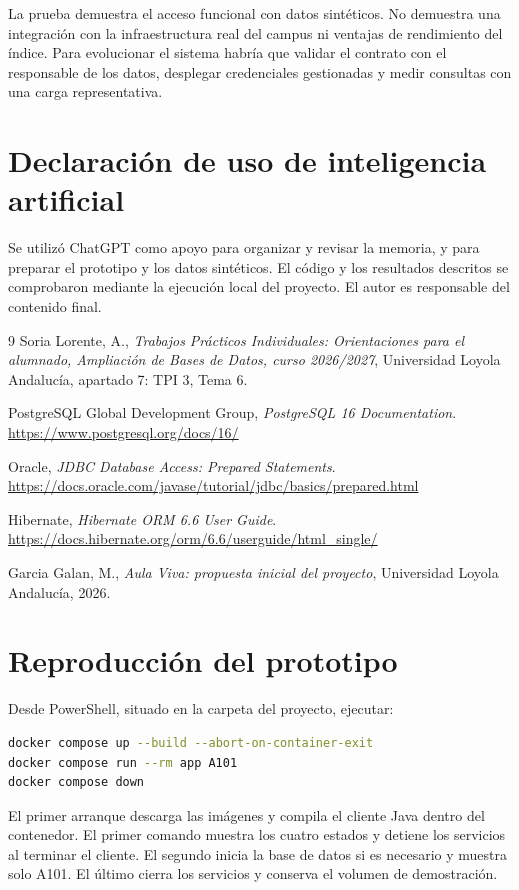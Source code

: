 \documentclass[a4paper,12pt]{article}
\begin{document}
La prueba demuestra el acceso funcional con datos sintéticos. No demuestra una integración con la infraestructura real del campus ni ventajas de rendimiento del índice. Para evolucionar el sistema habría que validar el contrato con el responsable de los datos, desplegar credenciales gestionadas y medir consultas con una carga representativa.

\section{Declaración de uso de inteligencia artificial}
Se utilizó ChatGPT como apoyo para organizar y revisar la memoria, y para preparar el prototipo y los datos sintéticos. El código y los resultados descritos se comprobaron mediante la ejecución local del proyecto. El autor es responsable del contenido final.

\begin{thebibliography}{9}
Soria Lorente, A., \textit{Trabajos Prácticos Individuales: Orientaciones para el alumnado, Ampliación de Bases de Datos, curso 2026/2027}, Universidad Loyola Andalucía, apartado 7: TPI 3, Tema 6.

PostgreSQL Global Development Group, \textit{PostgreSQL 16 Documentation}. \url{https://www.postgresql.org/docs/16/}

Oracle, \textit{JDBC Database Access: Prepared Statements}. \url{https://docs.oracle.com/javase/tutorial/jdbc/basics/prepared.html}

Hibernate, \textit{Hibernate ORM 6.6 User Guide}. \url{https://docs.hibernate.org/orm/6.6/userguide/html_single/}

Garcia Galan, M., \textit{Aula Viva: propuesta inicial del proyecto}, Universidad Loyola Andalucía, 2026.
\end{thebibliography}

\appendix
\section{Reproducción del prototipo}
Desde PowerShell, situado en la carpeta del proyecto, ejecutar:
\begin{lstlisting}[language=bash,caption={Arranque y consulta desde PowerShell}]
docker compose up --build --abort-on-container-exit
docker compose run --rm app A101
docker compose down
\end{lstlisting}
El primer arranque descarga las imágenes y compila el cliente Java dentro del contenedor. El primer comando muestra los cuatro estados y detiene los servicios al terminar el cliente. El segundo inicia la base de datos si es necesario y muestra solo A101. El último cierra los servicios y conserva el volumen de demostración.
\end{document}
